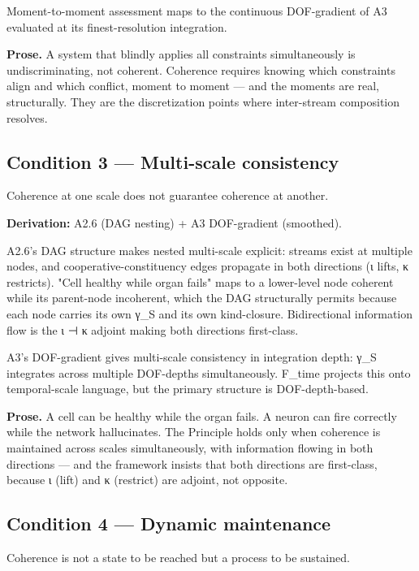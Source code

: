 \documentclass[11pt, openany]{book}
\renewenvironment{quote}{\begin{quoting}}{\end{quoting}}
\begin{document}
Moment-to-moment assessment maps to the continuous DOF-gradient of A3 evaluated at its finest-resolution integration.

\textbf{Prose.} A system that blindly applies all constraints simultaneously is undiscriminating, not coherent. Coherence requires knowing which constraints align and which conflict, moment to moment --- and the moments are real, structurally. They are the discretization points where inter-stream composition resolves.

\subsection{Condition 3 --- Multi-scale consistency}

\begin{quote}
Coherence at one scale does not guarantee coherence at another.
\end{quote}

\textbf{Derivation:} A2.6 (DAG nesting) + A3 DOF-gradient (smoothed).

A2.6's DAG structure makes nested multi-scale explicit: streams exist at multiple nodes, and cooperative-constituency edges propagate in both directions (ι lifts, κ restricts). "Cell healthy while organ fails" maps to a lower-level node coherent while its parent-node incoherent, which the DAG structurally permits because each node carries its own γ\_\allowbreak{}S and its own kind-closure. Bidirectional information flow is the ι ⊣ κ adjoint making both directions first-class.

A3's DOF-gradient gives multi-scale consistency in integration depth: γ\_\allowbreak{}S integrates across multiple DOF-depths simultaneously. F\_\allowbreak{}time projects this onto temporal-scale language, but the primary structure is DOF-depth-based.

\textbf{Prose.} A cell can be healthy while the organ fails. A neuron can fire correctly while the network hallucinates. The Principle holds only when coherence is maintained across scales simultaneously, with information flowing in both directions --- and the framework insists that both directions are first-class, because ι (lift) and κ (restrict) are adjoint, not opposite.

\subsection{Condition 4 --- Dynamic maintenance}

\begin{quote}
Coherence is not a state to be reached but a process to be sustained.
\end{quote}
\end{document}
